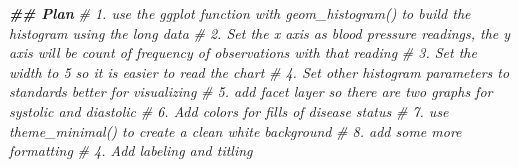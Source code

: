 \documentclass[
]{article}
\newenvironment{Shaded}{\begin{snugshade}}{\end{snugshade}}
\newcommand{\CommentTok}[1]{\textcolor[rgb]{0.56,0.35,0.01}{\textit{#1}}}
\newcommand{\DocumentationTok}[1]{\textcolor[rgb]{0.56,0.35,0.01}{\textbf{\textit{#1}}}}
\begin{document}
\begin{Shaded}
\begin{Highlighting}[]
\DocumentationTok{\#\# Plan}
\CommentTok{\# 1. use the ggplot function with geom\_histogram() to build the histogram using the long data }
\CommentTok{\# 2. Set the x axis as blood pressure readings, the y axis will be count of frequency of observations with that reading}
\CommentTok{\# 3. Set the width to 5 so it is easier to read the chart}
\CommentTok{\# 4. Set other histogram parameters to standards better for visualizing}
\CommentTok{\# 5. add facet layer so there are two graphs for systolic and diastolic}
\CommentTok{\# 6. Add colors for fills of disease status}
\CommentTok{\# 7. use theme\_minimal() to create a clean white background}
\CommentTok{\# 8. add some more formatting}
\CommentTok{\# 4. Add labeling and titling}


\end{Highlighting}
\end{Shaded}
\end{document}
